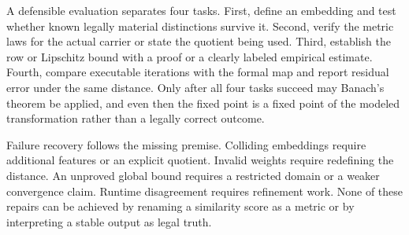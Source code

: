 A defensible evaluation separates four tasks. First, define an embedding and test whether known legally material distinctions survive it. Second, verify the metric laws for the actual carrier or state the quotient being used. Third, establish the row or Lipschitz bound with a proof or a clearly labeled empirical estimate. Fourth, compare executable iterations with the formal map and report residual error under the same distance. Only after all four tasks succeed may Banach's theorem be applied, and even then the fixed point is a fixed point of the modeled transformation rather than a legally correct outcome.

Failure recovery follows the missing premise. Colliding embeddings require additional features or an explicit quotient. Invalid weights require redefining the distance. An unproved global bound requires a restricted domain or a weaker convergence claim. Runtime disagreement requires refinement work. None of these repairs can be achieved by renaming a similarity score as a metric or by interpreting a stable output as legal truth.
